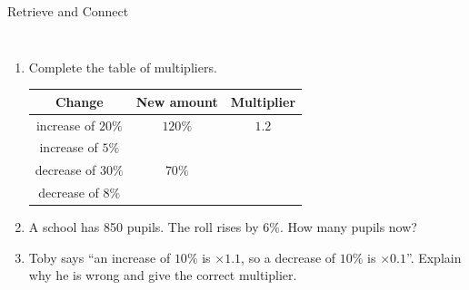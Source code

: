 \documentclass{beamer}
\renewcommand{\arraystretch}{0.92}
\newcommand{\ablank}[1]{%
  \alt<2>{\textcolor{red}{#1}}{\underline{\phantom{#1}}}%
}
\newcommand{\ashow}[1]{\uncover<2->{\textcolor{red}{\small #1}}}
\newcommand{\tightlist}{%
  \setlength{\itemsep}{0pt}\setlength{\parskip}{0pt}\setlength{\topsep}{0pt}%
}
\begin{document}
\begin{frame}[t]{Retrieve and Connect}
\begin{columns}[T]
\vspace{-1.8em}
\footnotesize
\begin{enumerate}\tightlist
{}
  \item Complete the table of multipliers.
  \vspace{0.3em}
  \begin{center}
  {\renewcommand{\arraystretch}{1.25}\setlength{\tabcolsep}{6pt}
  \begin{tabular}{c|c|c}
    Change & New amount & Multiplier\\ \hline
    increase of $20\%$ & $120\%$ & $1.2$\\
    increase of $5\%$  & \ablank{$105\%$} & \ablank{$1.05$}\\
    decrease of $30\%$ & $70\%$  & \ablank{$0.7$}\\
    decrease of $8\%$  & \ablank{$92\%$} & \ablank{$0.92$}
  \end{tabular}}
  \end{center}
  \vspace{0.4em}
  \item A school has 850 pupils. The roll rises by $6\%$. How many pupils now?
        \ashow{$850\times1.06=901$ pupils}
  \item Toby says ``an increase of $10\%$ is $\times1.1$, so a decrease of $10\%$ is $\times0.1$''.
        Explain why he is wrong and give the correct multiplier.
        \ashow{$\times0.1$ leaves only $10\%$, a decrease of $90\%$. A decrease of $10\%$ leaves $90\%$, so $\times0.9$.}
\end{enumerate}
\end{columns}
\end{frame}
\end{document}

